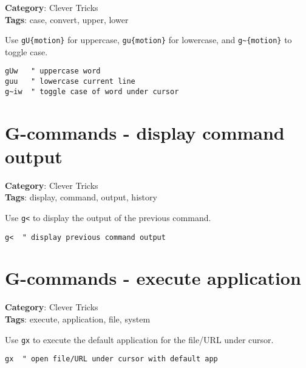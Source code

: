 {{{\textbf{Category}: Clever Tricks\\ \textbf{Tags}: case, convert, upper, lower
\vspace{0.5cm}

Use {\footnotesize \Verb§gU{motion}§} for uppercase, {\footnotesize \Verb§gu{motion}§} for lowercase, and {\footnotesize \Verb§g~{motion}§} to toggle case.

\begin{Exa*}{}
\begin{Verbatim}[fontsize=\footnotesize, breaklines, breakanywhere]
gUw   " uppercase word
guu   " lowercase current line
g~iw  " toggle case of word under cursor
\end{Verbatim}
\end{Exa*}

\section{G-commands - display command output}

\textbf{Category}: Clever Tricks\\ \textbf{Tags}: display, command, output, history
\vspace{0.5cm}

Use {\footnotesize \Verb§g<§} to display the output of the previous command.

\begin{Exa*}{}
\begin{Verbatim}[fontsize=\footnotesize, breaklines, breakanywhere]
g<  " display previous command output
\end{Verbatim}
\end{Exa*}

\section{G-commands - execute application}

\textbf{Category}: Clever Tricks\\ \textbf{Tags}: execute, application, file, system
\vspace{0.5cm}

Use {\footnotesize \Verb§gx§} to execute the default application for the file/URL under cursor.

\begin{Exa*}{}
\begin{Verbatim}[fontsize=\footnotesize, breaklines, breakanywhere]
gx  " open file/URL under cursor with default app
\end{Verbatim}
\end{Exa*}

}}}
